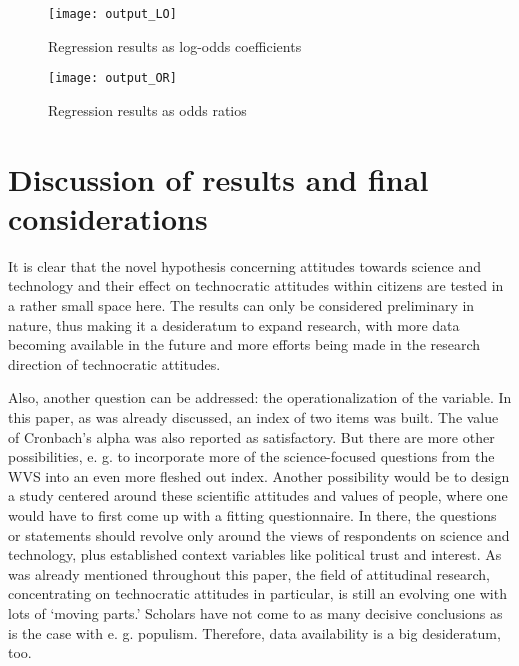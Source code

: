 \documentclass[
  12pt,
  english,
]{article}
\begin{document}
\begin{figure}

{\centering \texttt{[image: output\_LO]} 

}

\caption{Regression results as log-odds coefficients}\label{fig:insert graphics: LO table}
\end{figure}

\begin{figure}

{\centering \texttt{[image: output\_OR]} 

}

\caption{Regression results as odds ratios}\label{fig:insert graphics: OR table}
\end{figure}

\hypertarget{discussion-of-results-and-final-considerations}{%
\section{Discussion of results and final
considerations}\label{discussion-of-results-and-final-considerations}}

It is clear that the novel hypothesis concerning attitudes towards
science and technology and their effect on technocratic attitudes within
citizens are tested in a rather small space here. The results can only
be considered preliminary in nature, thus making it a desideratum to
expand research, with more data becoming available in the future and
more efforts being made in the research direction of technocratic
attitudes.

Also, another question can be addressed: the operationalization of the
variable. In this paper, as was already discussed, an index of two items
was built. The value of Cronbach's alpha was also reported as
satisfactory. But there are more other possibilities, e. g. to
incorporate more of the science-focused questions from the WVS into an
even more fleshed out index. Another possibility would be to design a
study centered around these scientific attitudes and values of people,
where one would have to first come up with a fitting questionnaire. In
there, the questions or statements should revolve only around the views
of respondents on science and technology, plus established context
variables like political trust and interest. As was already mentioned
throughout this paper, the field of attitudinal research, concentrating
on technocratic attitudes in particular, is still an evolving one with
lots of `moving parts.' Scholars have not come to as many decisive
conclusions as is the case with e. g. populism. Therefore, data
availability is a big desideratum, too.
\end{document}
